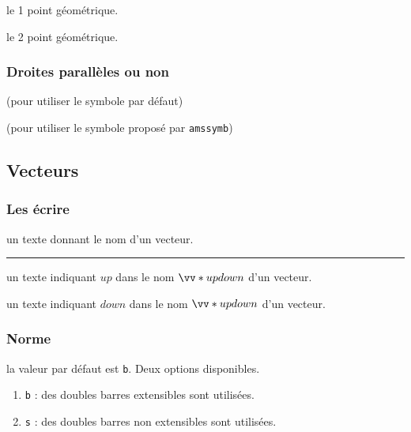 \documentclass[12pt,a4paper]{book}
\theoremstyle{definition}
\newcommand\separation{
	\medskip
	\hfill\rule{0.5\textwidth}{0.75pt}\hfill
	\medskip
}
\newcommand\extraspace{
	\vspace{0.25em}
}
\begin{document}
{{ le 1\ier{} point géométrique.

 le 2\ieme{} point géométrique.




\subsubsection{Droites parallèles ou non}





\extraspace

 (pour utiliser le symbole par défaut)

 (pour utiliser le symbole proposé par \verb+amssymb+)


\subsection{Vecteurs}

\subsubsection{Les écrire}




\IDarg{} un texte donnant le nom d'un vecteur.


\separation



 un texte indiquant $up$ dans le nom $\vect*{up}{down}$ d'un vecteur.

 un texte indiquant $down$ dans le nom $\vect*{up}{down}$ d'un vecteur.


\subsubsection{Norme}




\IDoption{} la valeur par défaut est \verb+b+. Deux options disponibles.
\begin{enumerate}
	\item \verb+b+ : des doubles barres extensibles sont utilisées.

	\item \verb+s+ : des doubles barres non extensibles sont utilisées.
\end{enumerate}


}}
\end{document}
